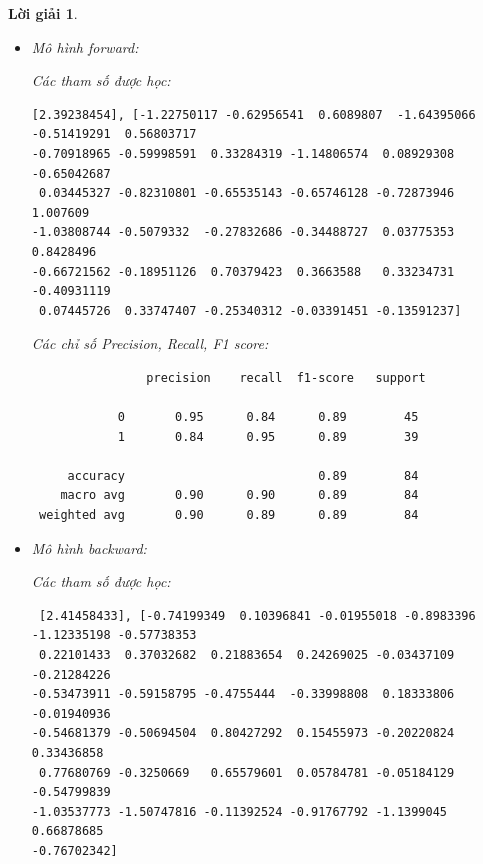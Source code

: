\documentclass[14pt, a4paper]{article}
\theoremstyle{sltheorem}
\theoremstyle{soltheorem}
\newtheorem*{loigiai}{Lời giải}
\begin{document}
\begin{loigiai}
\begin{itemize}
        Các chỉ số Precision, Recall, F1 score:

        \begin{verbatim}
                precision    recall  f1-score   support

            0       0.73      0.73      0.73        45
            1       0.69      0.69      0.69        39
 
     accuracy                           0.71        84
    macro avg       0.71      0.71      0.71        84
 weighted avg       0.71      0.71      0.71        84
        \end{verbatim}

        \item Mô hình forward:
        
        Các tham số được học:

        \begin{verbatim}
[2.39238454], [-1.22750117 -0.62956541  0.6089807  -1.64395066 -0.51419291  0.56803717
-0.70918965 -0.59998591  0.33284319 -1.14806574  0.08929308 -0.65042687
 0.03445327 -0.82310801 -0.65535143 -0.65746128 -0.72873946  1.007609
-1.03808744 -0.5079332  -0.27832686 -0.34488727  0.03775353  0.8428496
-0.66721562 -0.18951126  0.70379423  0.3663588   0.33234731 -0.40931119
 0.07445726  0.33747407 -0.25340312 -0.03391451 -0.13591237]
        \end{verbatim}

        Các chỉ số Precision, Recall, F1 score:

        \begin{verbatim}
                precision    recall  f1-score   support

            0       0.95      0.84      0.89        45
            1       0.84      0.95      0.89        39
 
     accuracy                           0.89        84
    macro avg       0.90      0.90      0.89        84
 weighted avg       0.90      0.89      0.89        84
        \end{verbatim}

        \item Mô hình backward:
        
        Các tham số được học:

        \begin{verbatim}
 [2.41458433], [-0.74199349  0.10396841 -0.01955018 -0.8983396  -1.12335198 -0.57738353
 0.22101433  0.37032682  0.21883654  0.24269025 -0.03437109 -0.21284226
-0.53473911 -0.59158795 -0.4755444  -0.33998808  0.18333806 -0.01940936
-0.54681379 -0.50694504  0.80427292  0.15455973 -0.20220824  0.33436858
 0.77680769 -0.3250669   0.65579601  0.05784781 -0.05184129 -0.54799839
-1.03537773 -1.50747816 -0.11392524 -0.91767792 -1.1399045   0.66878685
-0.76702342]
        \end{verbatim}


\end{itemize}
\end{loigiai}
\end{document}
